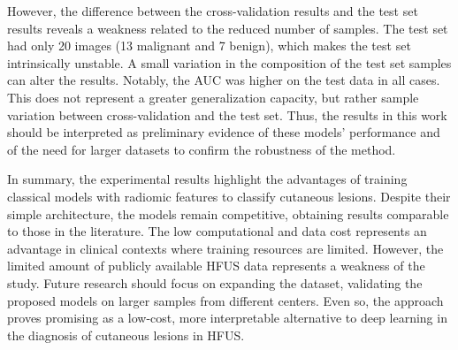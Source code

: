\documentclass[12pt,a4paper]{article}
\begin{document}
However, the difference between the cross-validation results and the test set results reveals a weakness related to the reduced number of samples. The test set had only 20 images (13 malignant and 7 benign), which makes the test set intrinsically unstable. A small variation in the composition of the test set samples can alter the results. Notably, the AUC was higher on the test data in all cases. This does not represent a greater generalization capacity, but rather sample variation between cross-validation and the test set. Thus, the results in this work should be interpreted as preliminary evidence of these models' performance and of the need for larger datasets to confirm the robustness of the method.

In summary, the experimental results highlight the advantages of training classical models with radiomic features to classify cutaneous lesions. Despite their simple architecture, the models remain competitive, obtaining results comparable to those in the literature. The low computational and data cost represents an advantage in clinical contexts where training resources are limited. However, the limited amount of publicly available HFUS data represents a weakness of the study. Future research should focus on expanding the dataset, validating the proposed models on larger samples from different centers. Even so, the approach proves promising as a low-cost, more interpretable alternative to deep learning in the diagnosis of cutaneous lesions in HFUS.

\printbibliography

\end{document}
